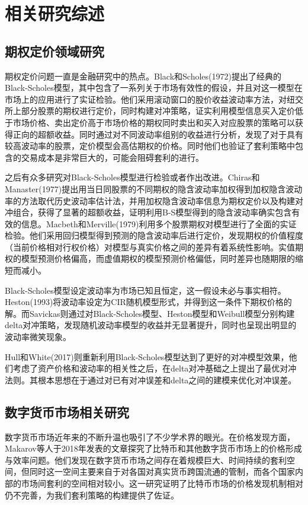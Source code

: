 \chapter{相关研究综述}
\section{期权定价领域研究}
\par{
期权定价问题一直是金融研究中的热点。Black和Scholes(1972)提出了经典的Black-Scholes模型\cite{10.2307/1831029}，其中包含了一系列关于市场有效性的假设，并且对这一模型在市场上的应用进行了实证检验\cite{J-1972}。他们采用滚动窗口的股价收益波动率方法，对纽交所上部分股票的期权进行定价，同时构建对冲策略，证实利用模型信息买入定价低于市场价格、卖出定价高于市场价格的期权同时卖出和买入对应股票的策略可以获得正向的超额收益。同时通过对不同波动率组别的收益进行分析，发现了对于具有较高波动率的股票，定价模型会高估期权的价格。同时他们也验证了套利策略中包含的交易成本是非常巨大的，可能会阻碍套利的进行。}
\par{
之后有众多研究对Black-Scholes模型进行检验或者作出改进。Chiras和Manaster(1977)提出用当日同股票的不同期权的隐含波动率加权得到加权隐含波动率的方法取代历史波动率估计法，并用加权隐含波动率信息为期权定价以及构建对冲组合，获得了显著的超额收益，证明利用B-S模型得到的隐含波动率确实包含有效的信息\cite{CHIRAS1978213}。Macbeth和Merville(1979)利用多个股票期权对模型进行了全面的实证检验\cite{Jame-1979}。他们采用回归模型得到预测的隐含波动率后进行定价，发现期权的价值程度（当前价格相对行权价格）对模型与真实价格之间的差异有着系统性影响。实值期权的模型预测价格偏高，而虚值期权的模型预测价格偏低，同时差异也随期限的缩短而减小。
}
\par{Black-Scholes模型设定波动率为市场已知且恒定，这一假设未必与事实相符。Heston(1993)将波动率设定为CIR随机模型形式，并得到这一条件下期权价格的解\cite{10.1093/rfs/6.2.327}。而Savickas则通过对Black-Scholes模型、Heston模型和Weibull模型分别构建delta对冲策略，发现随机波动率模型的收益并无显著提升，同时也呈现出明显的波动率微笑现象\cite{Rober-2005}。}
\par{
    Hull和White(2017)则重新利用Black-Scholes模型达到了更好的对冲模型效果，他们考虑了资产价格和波动率的相关性之后，在delta对冲基础之上提出了最优对冲法则\cite{Hull-2017}。其根本思想在于通过对已有对冲误差和delta之间的建模来优化对冲误差。
}
\section{数字货币市场相关研究}
\par{数字货币市场近年来的不断升温也吸引了不少学术界的眼光。在价格发现方面，Makarov等人于2018年发表的文章探究了比特币和其他数字货币市场上的价格形成与效率问题\cite{Makarov-2018}。他们发现在数字货币市场之间存在着规模巨大、时间持续的套利空间，但同时这一空间主要来自于对各国对真实货币跨国流通的管制，而各个国家内部的市场间套利的空间相对较小。这一研究证明了比特币市场的价格发现机制相对仍不完善，为我们套利策略的构建提供了佐证。
}
